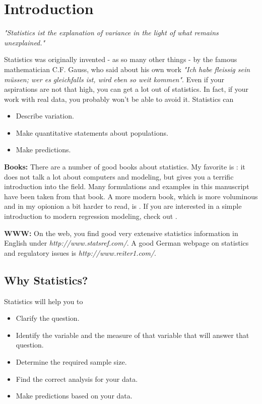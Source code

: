 \chapter{Introduction}

\emph{"Statistics ist the explanation of variance in the light of what remains
unexplained."}

\vspace{5 mm}

Statistics was originally invented - as so many other things - by the famous mathematician C.F. Gauss, who said about his own work \emph{"Ich habe fleissig sein m\"ussen; wer es gleichfalls ist, wird eben so weit kommen"}. Even if your aspirations are not that high, you can get a lot out of statistics. In fact, if your work with real data, you probably won't be able to avoid it. Statistics can

\begin{itemize}
  \item Describe variation.
  \item Make quantitative statements about populations.
  \item Make predictions.
\end{itemize}

\textbf{Books: }There are a number of good books about statistics. My favorite is \cite{altman99}: it does not talk a lot about computers and modeling, but gives you a terrific introduction into the field. Many formulations and examples in this manuscript have been taken from that book. A more modern book, which is more voluminous and in my opionion a bit harder to read, is \cite{Riffenburgh2012}. If you are interested in a simple introduction to modern regression modeling, check out \cite{Kaplan2009}.

\vspace{5 mm}

\textbf{WWW: }On the web, you find good very extensive statistics information in English under \emph{http://www.statsref.com/}. A good German webpage on statistics and regulatory issues is \emph{http://www.reiter1.com/}.

\section{Why Statistics?}

Statistics will help you to
\begin{itemize}
  \item Clarify the question.
  \item Identify the variable and the measure of that variable that will answer that question.
  \item Determine the required sample size.
  \item Find the correct analysis for your data.
  \item Make predictions based on your data.
\end{itemize}

